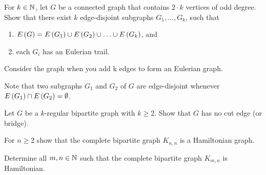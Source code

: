 \documentclass{article}
\begin{document}
\begin{exercise}
For $k\in\mathbb{N}$, let $G$ be a connected graph that contains $2\cdot k$ vertices of odd degree. Show that there exist $k$ edge-disjoint subgraphs $G_1,\ldots,G_k$, such that
\begin{enumerate}
 \item $E\left( G \right)=E\left( G_1 \right)\cup E\left( G_2 \right)\cup\ldots\cup E\left( G_k \right)$, and
 \item each $G_i$ has an Eulerian trail.
\end{enumerate}
\begin{hint}
Consider the graph when you add k edges to form an Eulerian graph.
\end{hint}
\begin{note}
Note that two subgraphs $G_1$ and $G_2$ of $G$ are edge-disjoint whenever $E\left( G_1 \right)\cap E\left( G_2 \right)=\emptyset$.
\begin{answer}

\end{answer}
\end{note}
\end{exercise}

\begin{exercise}
Let $G$ be a $k$-regular bipartite graph with $k\geq2$. Show that $G$ has no cut edge (or bridge).
\begin{answer}

\end{answer}
\end{exercise}

\begin{exercise}
For $n\geq2$ show that the complete bipartite graph $K_{n,n}$ is a Hamiltonian graph.
\begin{answer}

\end{answer}
\end{exercise}

\begin{exercise}
Determine all $m,n\in\mathbb{N}$ such that the complete bipartite graph $K_{m,n}$ is Hamiltonian.
\begin{answer}

\end{answer}
\end{exercise}
\end{document}
